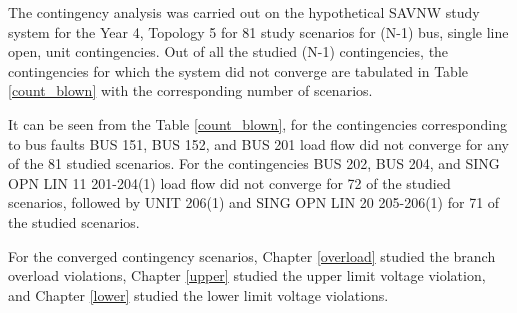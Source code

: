 \documentclass[10pt]{report}
\begin{document}
The contingency analysis was carried out on the hypothetical SAVNW study system for the Year 4, Topology 5 for 81 study scenarios for (N-1) bus, single line open, unit contingencies. Out of all the studied (N-1) contingencies, the contingencies for which the system did not converge are tabulated in Table \ref{count_blown} with the corresponding number of scenarios. 

It can be seen from the Table \ref{count_blown}, for the contingencies corresponding to bus faults BUS 151, BUS 152, and BUS 201 load flow did not converge for any of the 81 studied scenarios. For the contingencies BUS 202, BUS 204, and SING OPN LIN 11 201-204(1) load flow did not converge for 72 of the studied scenarios, followed by UNIT 206(1) and SING OPN LIN 20 205-206(1) for 71 of the studied scenarios. 

\begin{table}[H]
\caption{Count of scenarios for which tested contingency failed to converge}
\label{count_blown}
\centering
{}
\end{table}

For the converged contingency scenarios, Chapter \ref{overload} studied the branch overload violations, Chapter \ref{upper} studied the upper limit voltage violation, and Chapter \ref{lower} studied the lower limit voltage violations. 
\end{document}
